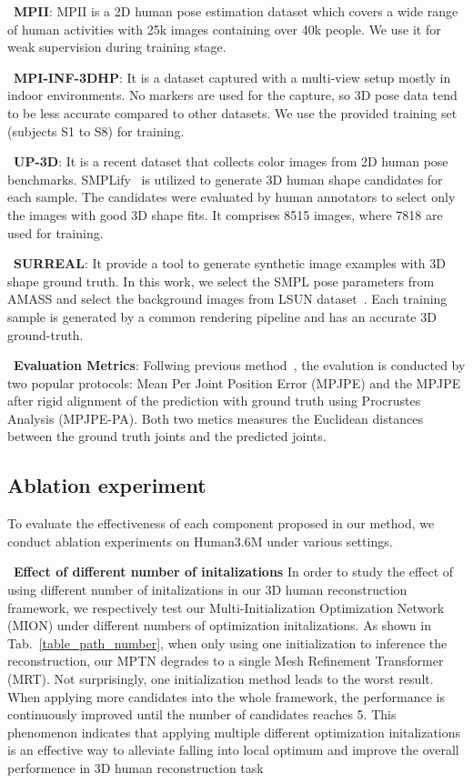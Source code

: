 \documentclass[sigconf]{acmart}
\begin{document}
~\textbf{MPII}: MPII is a 2D human pose estimation dataset which covers a wide range of human activities
with 25k images containing over 40k people. We use it for weak supervision during training stage. 

~\textbf{MPI-INF-3DHP}: It is a dataset captured with a multi-view setup mostly in indoor environments. No markers are used
for the capture, so 3D pose data tend to be less accurate compared to other datasets. We use the provided training
set (subjects S1 to S8) for training. 

~\textbf{UP-3D}: It is a recent dataset that collects color images from
2D human pose benchmarks. SMPLify~\cite{bogo2016keep} is utilized to generate 3D human shape candidates for each sample. The candidates were 
evaluated by human annotators to select only the images with good 3D shape fits. It comprises 8515 images, where 7818 are used for training. 

~\textbf{SURREAL}: It provide a tool to generate synthetic image examples with 3D shape ground truth. In this work, we select the 
SMPL pose parameters from AMASS and select the background images from LSUN dataset~\cite{yu2015lsun}. Each training sample is generated by a 
common rendering pipeline and has an accurate 3D ground-truth. 

~\textbf{Evaluation Metrics}: 
Follwing previous method~\cite{zhang2019danet, guler2019holopose, pavlakos2019texturepose}, the evalution is conducted by two popular protocols: Mean Per Joint Position Error (MPJPE) and the MPJPE after rigid alignment 
of the prediction with ground truth using Procrustes Analysis (MPJPE-PA). Both two metics measures the 
Euclidean distances between the ground truth joints and the predicted joints.

\subsection{Ablation experiment}

To evaluate the effectiveness of each component proposed in our
method, we conduct ablation experiments on Human3.6M under
various settings. 



~\textbf{Effect of different number of initalizations} In order to study the effect of using 
different number of initalizations in our 3D human reconstruction framework, 
we respectively test our Multi-Initialization Optimization Network (MION) under 
different numbers of optimization initalizations. 
As shown in Tab.~\ref{table_path_number}, when only using one initialization to inference the reconstruction, 
our MPTN degrades to a single Mesh Refinement Transformer (MRT). Not surprisingly, one initialization method 
leads to the worst result. When applying more candidates into the whole framework, the performance is 
continuously improved until the number of candidates reaches 5.  This phenomenon indicates that 
applying multiple different optimization initalizations is an effective way to alleviate 
falling into local optimum and improve the overall performence in 3D human reconstruction task
\end{document}
